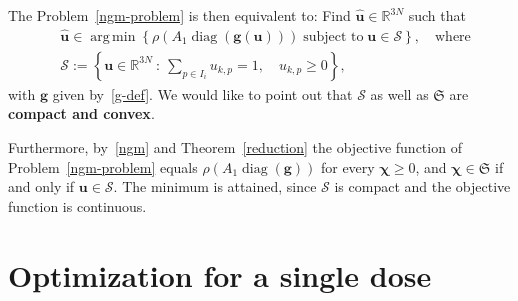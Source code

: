 \documentclass[11pt]{article}
\theoremstyle{plain}
\theoremstyle{definition}
\theoremstyle{remark}
\numberwithin{equation}{section}
\numberwithin{figure}{section}
\numberwithin{table}{section}
\numberwithin{algorithm}{section}
\begin{document}
The Problem~\ref{ngm-problem} is then equivalent to: Find $\widehat{\bm u}\in\mathbb{R}^{3N}$ such that
\begin{equation}\label{reduced-problem}
  \begin{aligned}
& \widehat{\bm u}\in\operatorname*{arg\,min}\left\{\rho\left(A_1\operatorname{diag}\left(\bm g(\bm u)\right)\right)\;\mbox{subject to}\;\bm u\in\mathcal{S}\right\},\quad\mbox{where}\\
&\mathcal{S}:=\left\{\bm u\in\mathbb{R}^{3N}\ :\ \sum_{p\in I_i}u_{k,p}=1,\quad u_{k,p}\ge 0\right\},
  \end{aligned}
\end{equation}
with $\bm g$ given by~\eqref{g-def}. We would like to point out that $\mathcal{S}$ as well as $\mathfrak{S}$ are {\bf compact and convex}. 

Furthermore, by~\eqref{ngm} and Theorem~\ref{reduction} the objective function of
Problem~\ref{ngm-problem} equals $\rho\left(A_1\operatorname{diag}(\bm g)\right)$
for every $\bm\chi\ge 0$, and $\bm\chi\in\mathfrak{S}$ if and only if
$\bm u\in\mathcal{S}$. The minimum is attained, since $\mathcal{S}$ is compact
and the objective function is continuous.

\section{Optimization for a single dose}\label{sec-single}
\end{document}
